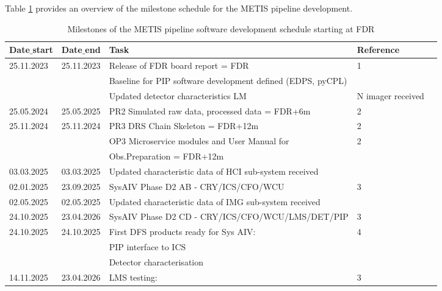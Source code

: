 Table \ref{tab:development_schedule} provides an overview of the milestone schedule for the METIS pipeline development.

\begin{table}
    \caption[Development schedule]{Milestones of the METIS pipeline software development schedule starting at FDR}
  \label{tab:development_schedule}

\centering
\scriptsize
\begin{tabularx}{\textwidth}{lllll}

\hline
Date$\_$start &	Date$\_$end   &	Task                            &		Reference \\
\hline\hline
25.11.2023 &	25.11.2023 &	Release of FDR board report = FDR        &	1 \\
	   &		   &	Baseline for PIP software development defined (EDPS, pyCPL) &	\\
	   &    	   &    Updated detector characteristics LM & N imager received     &	\\
\hline
25.05.2024 &	25.05.2025 &	PR2 Simulated raw data, processed data = FDR+6m             &	2 \\
\hline
25.11.2024 &	25.11.2024 &	PR3 DRS Chain Skeleton = FDR+12m                            &	2 \\
	   &		   &	OP3 Microservice modules and User Manual for                &	2 \\
           &               &    Obs.Preparation = FDR+12m                                   &	\\
\hline
03.03.2025 & 	03.03.2025 &	Updated characteristic data of HCI sub-system received      & 	\\
\hline
02.01.2025 &	23.09.2025 &	SysAIV Phase D2 AB - CRY/ICS/CFO/WCU                        &	3 \\
\hline
02.05.2025 & 	02.05.2025 &	Updated characteristic data of IMG sub-system received	    &   \\
\hline
24.10.2025 &	23.04.2026 &	SysAIV Phase D2 CD - CRY/ICS/CFO/WCU/LMS/DET/PIP            &	3 \\
\hline
24.10.2025 &	24.10.2025 &	First DFS products ready for Sys AIV:                       &	4 \\
           &               &    PIP interface to ICS                                        &	\\
           &               &    Detector characterisation                                   &	\\
\hline
14.11.2025 &	23.04.2026 &	LMS testing:                                                &	3 \\                       

\end{tabularx}
\end{table}
